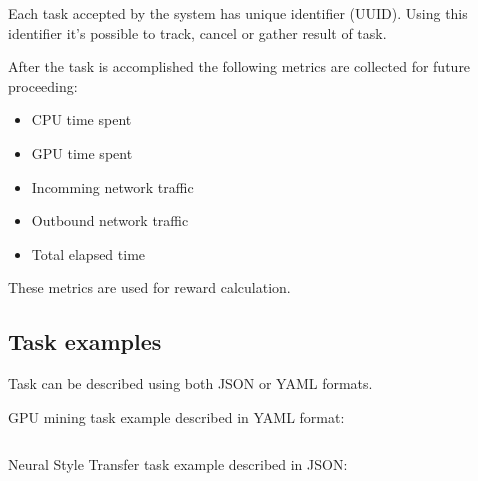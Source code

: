 Each task accepted by the system has unique identifier (UUID)\cite{uuid}.
Using this identifier it's possible to track, cancel or gather result of task.

After the task is accomplished the following metrics are collected for future proceeding:

\begin{itemize}
    \item CPU time spent
    \item GPU time spent
    \item Incomming network traffic
    \item Outbound network traffic
    \item Total elapsed time
\end{itemize}

These metrics are used for reward calculation.

\subsection{Task examples}

Task can be described using both JSON or YAML formats.

GPU mining task example described in YAML format:

\inputminted{yaml}{claymore-cuda-mining-task.yaml}

\newpage
Neural Style Transfer task example described in JSON:

\inputminted{json}{neural-style-task.json}
